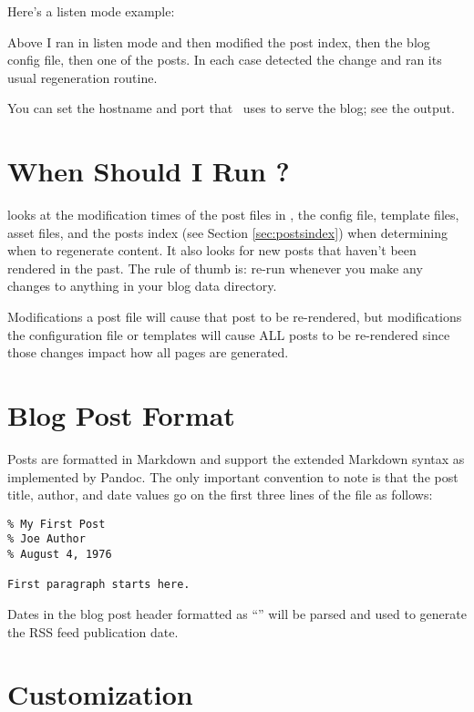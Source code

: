 \documentclass[11pt, letterpaper, oneside, titlepage]{book}
\begin{document}
Here's a listen mode example:


Above I ran  in listen mode and then modified the post index,
then the blog config file, then one of the posts.  In each case
 detected the change and ran its usual regeneration routine.

You can set the hostname and port that \mathblog\ uses to serve the
blog; see the  output.

\section{When Should I Run ?}

 looks at the modification times of the post files in
, the config file, template files, asset files, and the
posts index (see Section \ref{sec:postsindex}) when determining when
to regenerate content.  It also looks for new posts that haven't been
rendered in the past.  The rule of thumb is: re-run  whenever
you make any changes to anything in your blog data directory.

Modifications a post file will cause that post to be re-rendered, but
modifications the configuration file or templates will cause ALL posts
to be re-rendered since those changes impact how all pages are
generated.

\section{Blog Post Format}

Posts are formatted in Markdown and support the extended Markdown
syntax as implemented by Pandoc.  The only important convention to
note is that the post title, author, and date values go on the first
three lines of the file as follows:

\begin{verbatim}
% My First Post
% Joe Author
% August 4, 1976

First paragraph starts here.
\end{verbatim}

Dates in the blog post header formatted as ``'' will be parsed and used to generate the RSS feed
publication date.

\section{Customization}
\label{sec:customizing}
\end{document}
